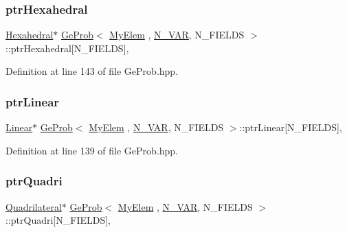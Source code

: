\subsubsection{\texorpdfstring{ptr\+Hexahedral}{ptrHexahedral}}
{\footnotesize\ttfamily \hyperlink{classHexahedral}{Hexahedral}$\ast$ \hyperlink{classGeProb}{Ge\+Prob}$<$ \hyperlink{DG__Prob_8h_a83cd887ced9a6587428f267e50cd4787}{My\+Elem} , \hyperlink{classED__Prob_a4e7d2ff1a8e435e336fb00c527224b5a}{N\+\_\+\+V\+AR}, N\+\_\+\+F\+I\+E\+L\+DS $>$\+::ptr\+Hexahedral\mbox{[}N\+\_\+\+F\+I\+E\+L\+DS\mbox{]}\hspace{0.3cm}{\ttfamily [protected]}, {\ttfamily [inherited]}}



Definition at line 143 of file Ge\+Prob.\+hpp.

\mbox{\label{classGeProb_af9350545b7ee2ebe6488a50dd1f38c8c}} 
\subsubsection{\texorpdfstring{ptr\+Linear}{ptrLinear}}
{\footnotesize\ttfamily \hyperlink{classLinear}{Linear}$\ast$ \hyperlink{classGeProb}{Ge\+Prob}$<$ \hyperlink{DG__Prob_8h_a83cd887ced9a6587428f267e50cd4787}{My\+Elem} , \hyperlink{classED__Prob_a4e7d2ff1a8e435e336fb00c527224b5a}{N\+\_\+\+V\+AR}, N\+\_\+\+F\+I\+E\+L\+DS $>$\+::ptr\+Linear\mbox{[}N\+\_\+\+F\+I\+E\+L\+DS\mbox{]}\hspace{0.3cm}{\ttfamily [protected]}, {\ttfamily [inherited]}}



Definition at line 139 of file Ge\+Prob.\+hpp.

\mbox{\label{classGeProb_ada73c5b700f7681fde499a3a27ff377e}} 
\subsubsection{\texorpdfstring{ptr\+Quadri}{ptrQuadri}}
{\footnotesize\ttfamily \hyperlink{classQuadrilateral}{Quadrilateral}$\ast$ \hyperlink{classGeProb}{Ge\+Prob}$<$ \hyperlink{DG__Prob_8h_a83cd887ced9a6587428f267e50cd4787}{My\+Elem} , \hyperlink{classED__Prob_a4e7d2ff1a8e435e336fb00c527224b5a}{N\+\_\+\+V\+AR}, N\+\_\+\+F\+I\+E\+L\+DS $>$\+::ptr\+Quadri\mbox{[}N\+\_\+\+F\+I\+E\+L\+DS\mbox{]}\hspace{0.3cm}{\ttfamily [protected]}, {\ttfamily [inherited]}}



